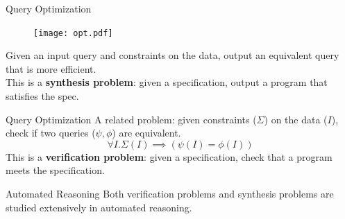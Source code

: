 \documentclass{beamer}
\begin{document}
  \begin{frame}{Query Optimization}
    \begin{figure}
      \texttt{[image: opt.pdf]}
    \end{figure}
    Given an input query and constraints on the data, 
    output an equivalent query that is more efficient. \pause \\
    This is a \textbf{synthesis problem}: given a specification,
    output a program that satisfies the spec.
  \end{frame}

  \begin{frame}{Query Optimization}
    A related problem: given constraints ($\Sigma$) on the data ($I$), 
    check if two queries ($\psi, \phi$) are equivalent.
    \[\forall I . \Sigma(I) \implies (\psi(I) = \phi(I)) \] \pause
    This is a \textbf{verification problem}:
    given a specification, check that a program meets the specification.
  \end{frame}

  \begin{frame}{Automated Reasoning}
    Both verification problems and synthesis problems are studied 
    extensively in automated reasoning.
  \end{frame}

\end{document}
